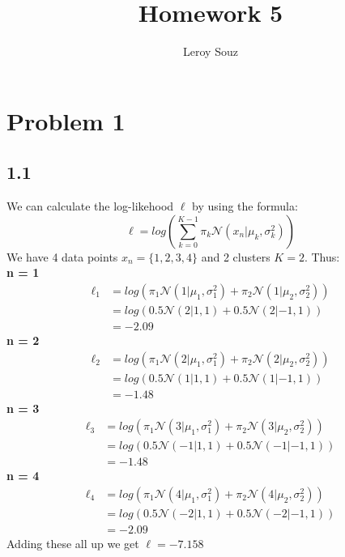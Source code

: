 \documentclass{article}
\title{Homework 5}
\author{Leroy Souz}
\begin{document}
\maketitle

\section{Problem 1}

\subsection*{1.1}
We can calculate the log-likehood $\ell$ by using the formula:
\begin{equation}
    \ell = log(\sum_{k=0}^{K-1}\pi_k\mathcal{N}(x_n|\mu_k,\sigma_k^2))
\end{equation}
We have 4 data points $x_n = \{1, 2, 3, 4\}$ and 2 clusters $K = 2$. Thus: \\
\textbf{n = 1}
\begin{align*}
    \ell_1 &= log(\pi_1\mathcal{N}(1|\mu_1,\sigma_1^2) + \pi_2\mathcal{N}(1|\mu_2,\sigma_2^2))\\
    &= log(0.5\mathcal{N}(2|1,1) + 0.5\mathcal{N}(2|-1,1))\\
    &= -2.09
\end{align*}
\textbf{n = 2}
\begin{align*}
    \ell_2 &= log(\pi_1\mathcal{N}(2|\mu_1,\sigma_1^2) + \pi_2\mathcal{N}(2|\mu_2,\sigma_2^2))\\
    &= log(0.5\mathcal{N}(1|1,1) + 0.5\mathcal{N}(1|-1,1))\\
    &= -1.48
\end{align*}
\textbf{n = 3}
\begin{align*}
    \ell_3 &= log(\pi_1\mathcal{N}(3|\mu_1,\sigma_1^2) + \pi_2\mathcal{N}(3|\mu_2,\sigma_2^2))\\
    &= log(0.5\mathcal{N}(-1|1,1) + 0.5\mathcal{N}(-1|-1,1))\\
    &= -1.48
\end{align*}
\textbf{n = 4}
\begin{align*}
    \ell_4 &= log(\pi_1\mathcal{N}(4|\mu_1,\sigma_1^2) + \pi_2\mathcal{N}(4|\mu_2,\sigma_2^2))\\
    &= log(0.5\mathcal{N}(-2|1,1) + 0.5\mathcal{N}(-2|-1,1))\\
    &= -2.09
\end{align*}
Adding these all up we get $\ell = -7.158$
\end{document}
